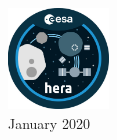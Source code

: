 \begin{titlepage}
    \vspace{2cm}
    \includegraphics[width=0.2\textwidth]{../rsc/hera.png}\\

    \vfill
    January 2020
\end{titlepage}
